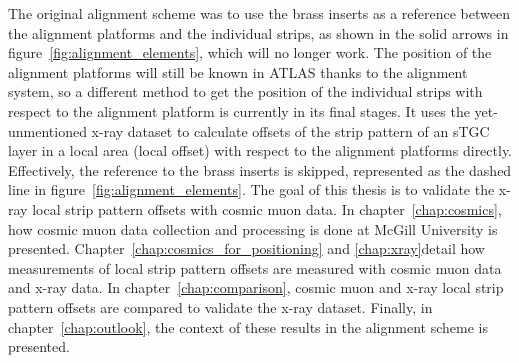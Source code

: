 The original alignment scheme was to use the brass inserts as a reference between the alignment platforms and the individual strips, as shown in the solid arrows in figure~\ref{fig:alignment_elements}, which will no longer work. The position of the alignment platforms will still be known in ATLAS thanks to the alignment system, so a different method to get the position of the individual strips with respect to the alignment platform is currently in its final stages. It uses the yet-unmentioned x-ray dataset to calculate offsets of the strip pattern of an sTGC layer in a local area (local offset) with respect to the alignment platforms directly. Effectively, the reference to the brass inserts is skipped, represented as the dashed line in figure~\ref{fig:alignment_elements}. The goal of this thesis is to validate the x-ray local strip pattern offsets with cosmic muon data. In chapter~\ref{chap:cosmics}, how cosmic muon data collection and processing is done at McGill University is presented. Chapter~\ref{chap:cosmics_for_positioning} and \ref{chap:xray}detail how measurements of local strip pattern offsets are measured with cosmic muon data and x-ray data. In chapter~\ref{chap:comparison}, cosmic muon and x-ray local strip pattern offsets are compared to validate the x-ray dataset. Finally, in chapter~\ref{chap:outlook}, the context of these results in the alignment scheme is presented.

































